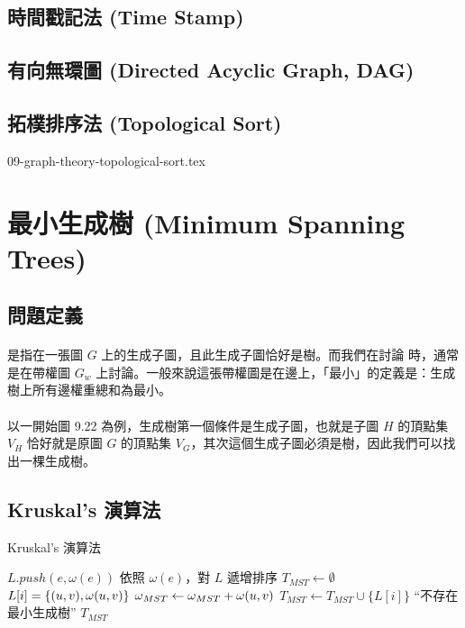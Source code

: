 \documentclass[12pt,a4paper,oneside]{report}
\begin{document}
\begin{CJK}{UTF8}{bkai}
\subsection{時間戳記法 (Time Stamp)}
\subsection{有向無環圖 (Directed Acyclic Graph, DAG)}
\subsection{拓樸排序法 (Topological Sort)}

{09-graph-theory-topological-sort.tex}

\section{最小生成樹 (Minimum Spanning Trees)}

\subsection{問題定義}
\paragraph{} 是指在一張圖 $G$ 上的生成子圖，且此生成子圖恰好是樹。而我們在討論\textbf{} 時，通常是在帶權圖 $G_w$ 上討論。一般來說這張帶權圖是在邊上，「最小」的定義是：生成樹上所有邊權重總和為最小。
\paragraph{}以一開始圖 9.22 為例，生成樹第一個條件是生成子圖，也就是子圖 $H$ 的頂點集 $V_H$ 恰好就是原圖 $G$ 的頂點集 $V_G$，其次這個生成子圖必須是樹，因此我們可以找出一棵生成樹。

\subsection{Kruskal's 演算法}
\begin{algorithm}
\caption{Kruskal's 演算法}
\label{algo:mst_kruskal}
\begin{algorithmic}[1]
    \State $L.push(e,\omega{(e)})$
  \EndFor
    \State {}
  \EndFor
  \State 依照 $\omega{(e)}$，對 $L$ 遞增排序
  \State $T_{MST}\gets{\emptyset}$
    \State $L[i]=\{{({u},{v}),\omega{\ensuremath{({u},{v})}}}\}$
      \State {}
      \State $\omega{}_{MST}\gets{\omega{}_{MST}+\omega{\ensuremath{({u},{v})}}}$
      \State $T_{MST}\gets{T_{MST}\cup{\{L[i]\}}}$
    \EndIf
  \EndFor
    \State \Return ``不存在最小生成樹''
  \EndIf
  \State \Return $T_{MST}$
\EndProcedure
\end{algorithmic}
\end{algorithm}


\end{CJK}
\end{document}
